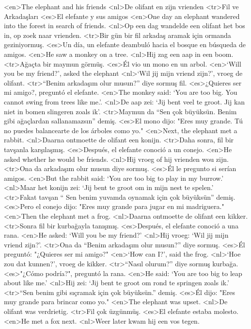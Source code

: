 <en>The elephant and his friends  
<nl>De olifant en zijn vrienden 
<tr>Fil ve Arkadaşları 
<es>El elefante y sus amigos
<en>One day an elephant wandered into the forest in search of friends. 
<nl>Op een dag wandelde  een  olifant het bos in, op zoek naar vrienden. 
<tr>Bir gün bir fil arkadaş aramak için ormanda geziniyormuş. 
<es>Un día, un elefante deambuló hacia el bosque en búsqueda de amigos.
<en>He saw a monkey on a tree.  
<nl>Hij zag een aap in een boom.  
<tr>Ağaçta bir maymun görmüş. 
<es>Él vio un mono en un arbol.
<en>`Will you be my friend?', asked the elephant  
<nl>`Wil jij mijn  vriend zijn?', vroeg de olifant.  
<tr>“Benim arkadaşım olur musun?” diye sormuş fil. 
<es>¿Quieres ser mi amigo?, preguntó el elefante.
<en>The monkey said: `You are too big. You cannot swing from trees like me.'.  
<nl>De aap zei: `Jij bent veel te groot. Jij kan niet in bomen slingeren zoals ik'.  
<tr>Maymun da “Sen çok büyüksün. Benim gibi ağaçlardan sallanamazsın” demiş. 
<es>El mono dijo: "Eres muy grande. Tú no puedes balancearte de los árboles como yo."
<en>Next, the elephant met a rabbit.  
<nl>Daarna ontmoette de olifant een konijn.  
<tr>Daha sonra, fil bir tavşanla karşılaşmış. 
<es>Después, el elefante conoció a un conejo.
<en>He asked whether he would be friends. 
<nl>Hij vroeg of hij vrienden wou zijn.  
<tr>Ona da arkadaşım olur musun diye sormuş. 
<es>Él le pregunto si serían amigos.
<en>But the rabbit said: `You are too big to play in my burrow.'  
<nl>Maar het konijn zei: `Jij bent te groot om in mijn nest te spelen.'  
<tr>Fakat tavşan “ Sen benim  yuvamda oynamak için çok büyüksün” demiş. 
<es>Pero el conejo dijo: "Eres muy grande para jugar en mi madriguera."
<en>Then the elephant met a frog. 
<nl>Daarna ontmoette de olifant een kikker.  
<tr>Sonra fil bir kurbağayla tanışmış. 
<es>Después, el elefante conoció a una rana.
<en>He asked: `Will you be my friend?' 
<nl>Hij vroeg: `Wil jij mijn vriend zijn?'.  
<tr>Ona da “Benim arkadaşım olur musun?” diye sormuş. 
<es>Él preguntó: "¿Quieres ser mi amigo?"
<en>`How  can I?', said the frog. 
<nl>`Hoe zou dat kunnen?', vroeg de kikker.  
<tr>“Nasıl olurum?” diye sormuş kurbağa.  
<es>"¿Cómo podría?", preguntó la rana.
<en>He said: `You are too big to leap about like me.' 
<nl>Hij zei: `Jij bent te groot om rond te springen zoals ik.'  
<tr>“Sen benim gibi sıçramak için çok büyüksün.” demiş. 
<es>Él dijo: "Eres muy grande para brincar como yo."
<en>The elephant was upset.  
<nl>De olifant was verdrietig.  
<tr>Fil çok üzgünmüş. 
<es>El elefante estaba molesto.
<en>He met a fox next. 
<nl>Weer later kwam hij een vos tegen.  
